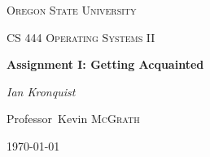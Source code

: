 \documentclass[10pt,conference,draftclsnofoot,onecolumn]{IEEEtran}
\begin{document}
\begin{titlepage}
    \centering
    {\scshape\LARGE Oregon State University \par}
    \vspace{1cm}
    {\scshape\Large CS 444 Operating Systems II\par}
    \vspace{1.5cm}
    {\huge\bfseries Assignment I: Getting Acquainted\par}
    \vspace{2cm}
    {\Large\itshape Ian Kronquist\par}
    \vfill
    \par
    Professor~Kevin \textsc{McGrath}

    \vfill

    {\large \today\par}
\end{titlepage}

%





\author{
}


\begin{abstract}
In this project I compiled version 3.14.26 of the Linux kernel on a Centos
server and ran it in a virtual machine using qemu. Additionally, I completed a
project implementing a classic problem in the field of concurrency.
\end{abstract}
\end{document}
